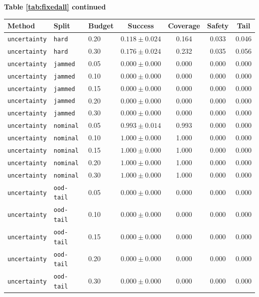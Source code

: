 \documentclass{article}
\begin{document}
\begin{center}
\textbf{Table \ref{tab:fixedall} continued}\\[0.4ex]
\begin{tabular}{lllcccc}
\toprule
Method & Split & Budget & Success & Coverage & Safety & Tail \\
\midrule
\texttt{uncertainty} & \texttt{hard} & 0.20 & $0.118 \pm 0.024$ & 0.164 & 0.033 & 0.046 \\
\texttt{uncertainty} & \texttt{hard} & 0.30 & $0.176 \pm 0.024$ & 0.232 & 0.035 & 0.056 \\
\texttt{uncertainty} & \texttt{jammed} & 0.05 & $0.000 \pm 0.000$ & 0.000 & 0.000 & 0.000 \\
\texttt{uncertainty} & \texttt{jammed} & 0.10 & $0.000 \pm 0.000$ & 0.000 & 0.000 & 0.000 \\
\texttt{uncertainty} & \texttt{jammed} & 0.15 & $0.000 \pm 0.000$ & 0.000 & 0.000 & 0.000 \\
\texttt{uncertainty} & \texttt{jammed} & 0.20 & $0.000 \pm 0.000$ & 0.000 & 0.000 & 0.000 \\
\texttt{uncertainty} & \texttt{jammed} & 0.30 & $0.000 \pm 0.000$ & 0.000 & 0.000 & 0.000 \\
\texttt{uncertainty} & \texttt{nominal} & 0.05 & $0.993 \pm 0.014$ & 0.993 & 0.000 & 0.000 \\
\texttt{uncertainty} & \texttt{nominal} & 0.10 & $1.000 \pm 0.000$ & 1.000 & 0.000 & 0.000 \\
\texttt{uncertainty} & \texttt{nominal} & 0.15 & $1.000 \pm 0.000$ & 1.000 & 0.000 & 0.000 \\
\texttt{uncertainty} & \texttt{nominal} & 0.20 & $1.000 \pm 0.000$ & 1.000 & 0.000 & 0.000 \\
\texttt{uncertainty} & \texttt{nominal} & 0.30 & $1.000 \pm 0.000$ & 1.000 & 0.000 & 0.000 \\
\texttt{uncertainty} & \texttt{ood-tail} & 0.05 & $0.000 \pm 0.000$ & 0.000 & 0.000 & 0.000 \\
\texttt{uncertainty} & \texttt{ood-tail} & 0.10 & $0.000 \pm 0.000$ & 0.000 & 0.000 & 0.000 \\
\texttt{uncertainty} & \texttt{ood-tail} & 0.15 & $0.000 \pm 0.000$ & 0.000 & 0.000 & 0.000 \\
\texttt{uncertainty} & \texttt{ood-tail} & 0.20 & $0.000 \pm 0.000$ & 0.000 & 0.000 & 0.000 \\
\texttt{uncertainty} & \texttt{ood-tail} & 0.30 & $0.000 \pm 0.000$ & 0.000 & 0.000 & 0.000 \\

\end{tabular}
\end{center}
\end{document}
